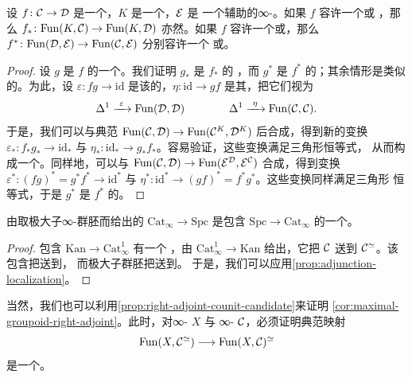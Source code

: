 \begin{proposition}\label{prop:adjoint-functor-categories}
设 $f\colon \mathcal{C} \to \mathcal{D}$ 是一个\trFunctor{}，$K$ 是一个\trSimplicialSet{}，$\mathcal{E}$ 是
一个辅助的∞-\trCategory{}。如果 $f$ 容许一个\trRightAdjoint{}或%
\trLeftAdjoint{}，那么 $f_*\colon \mathrm{Fun}(K, \mathcal{C}) \to \mathrm{Fun}(K, \mathcal{D})$
亦然。如果 $f$ 容许一个\trRightAdjoint{}或\trLeftAdjoint{}，那么
$f^*\colon \mathrm{Fun}(\mathcal{D}, \mathcal{E}) \to \mathrm{Fun}(\mathcal{C}, \mathcal{E})$ 分别容许一个%
\trLeftAdjoint{}或\trRightAdjoint{}。
\end{proposition}

\begin{proof}
设 $g$ 是 $f$ 的一个\trRightAdjoint{}。我们证明 $g_*$ 是 $f_*$ 的%
\trRightAdjoint{}，而
$g^*$ 是 $f^*$ 的\trLeftAdjoint{}；其余情形是类似的。为此，设
$\varepsilon\colon fg \to \mathrm{id}$
是该\trAdjunction{}的\trCounit{}，$\eta\colon \mathrm{id} \to gf$
是其\trUnit{}，把它们视为\trMorphism{}%
\[
\Delta^1 \xrightarrow{\ \varepsilon\ } \mathrm{Fun}(\D, \D)
\qquad\qquad
\Delta^1 \xrightarrow{\ \eta\ } \mathrm{Fun}(\C, \C).
\]
于是，我们可以与典范\trFunctor{}%
$\mathrm{Fun}(\mathcal{C}, \mathcal{D}) \to \mathrm{Fun}(\mathcal{C}^K, \mathcal{D}^K)$ 后合成，得到新的变换
$\varepsilon_*\colon f_*g_* \to \mathrm{id}_*$ 与
$\eta_*\colon \mathrm{id}_* \to g_*f_*$。容易验证，这些变换满足三角形恒等式，
从而构成一个\trAdjunction{}。同样地，可以与\trFunctor{}%
$\mathrm{Fun}(\mathcal{C}, \mathcal{D}) \to \mathrm{Fun}(\mathcal{E}^{\mathcal{D}}, \mathcal{E}^{\mathcal{C}})$ 合成，得到变换
$\varepsilon^*\colon (fg)^* = g^*f^* \to \mathrm{id}^*$ 与
$\eta^*\colon \mathrm{id}^* \to (gf)^* = f^*g^*$。这些变换同样满足三角形
恒等式，于是 $g^*$ 是 $f^*$ 的\trLeftAdjoint{}。
\end{proof}

\begin{corollary}\label{cor:maximal-groupoid-right-adjoint}
由取极大子∞-群胚而给出的\trFunctor{}%
$\mathrm{Cat}_{\infty} \to \mathrm{Spc}$ 是包含
$\mathrm{Spc} \to \mathrm{Cat}_{\infty}$ 的一个\trRightAdjoint{}。
\end{corollary}

\begin{proof}
包含\trFunctor{} $\mathrm{Kan} \to \mathrm{Cat}^1_{\infty}$ 有一个%
\trRightAdjoint{}，由 $\mathrm{Cat}^1_{\infty} \to \mathrm{Kan}$ 给出，它把 $\mathcal{C}$
送到 $\mathcal{C}^{\simeq}$。该包含把\trHomotopyEquivalence{}送到\trJoyalEquivalence{}，
而极大子群胚\trFunctor{}把\trJoyalEquivalence{}送到\trHomotopyEquivalence{}。
于是，我们可以应用\cref{prop:adjunction-localization}。
\end{proof}

\begin{remark}\label{rem:maximal-groupoid-via-counit}
当然，我们也可以利用\cref{prop:right-adjoint-counit-candidate}来证明%
\cref{cor:maximal-groupoid-right-adjoint}。此时，对∞-\trGroupoid{} $X$ 与
∞-\trCategory{} $\mathcal{C}$，必须证明典范映射
\[
\mathrm{Fun}(X, \mathcal{C}^{\simeq}) \longrightarrow \mathrm{Fun}(X, \mathcal{C})^{\simeq}
\]
是一个\trHomotopyEquivalence{}。
\end{remark}

